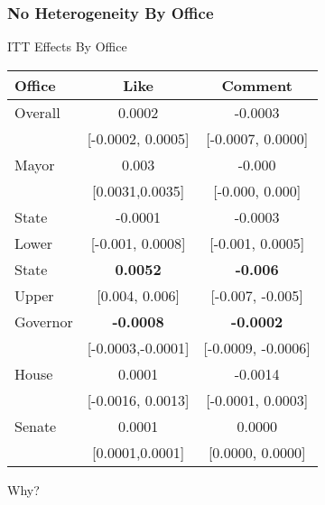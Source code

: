 \documentclass[xcolor=dvipsnames]{beamer}
\begin{document}
\begin{frame}
\frametitle{No Heterogeneity By Office}

ITT Effects By Office
\begin{center}
\begin{tabular}{l|cc}
\hline \hline
Office & Like & Comment \\
\hline
Overall & 0.0002 & -0.0003 \\
        &   [-0.0002, 0.0005]    & [-0.0007, 0.0000]\\
\hline\hline
Mayor & 0.003 & -0.000 \\
      & [0.0031,0.0035] & [-0.000, 0.000] \\
\hline
State & -0.0001            & -0.0003 \\
Lower &  [-0.001, 0.0008]  & [-0.001, 0.0005] \\
\hline
State    & \textbf{0.0052} & \textbf{-0.006} \\
Upper   & [0.004, 0.006]&  [-0.007, -0.005] \\
\hline
Governor & \textbf{-0.0008} & \textbf{-0.0002} \\
        & [-0.0003,-0.0001] & [-0.0009, -0.0006] \\
        \hline
House   & 0.0001 & -0.0014 \\
        & [-0.0016, 0.0013] & [-0.0001, 0.0003] \\
        \hline
Senate  & 0.0001 & 0.0000 \\
        & [0.0001,0.0001] & [0.0000, 0.0000] \\
        \hline\hline
\end{tabular}
\end{center}

\end{frame}

\begin{frame}
\Large

Why? \pause 
\begin{itemize}
   \pause 
   \pause 
\end{itemize}



\end{frame}
\end{document}
